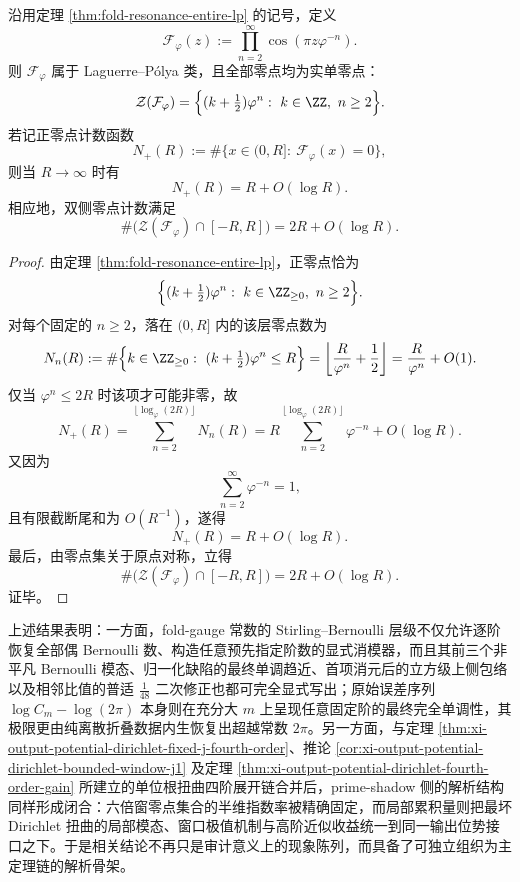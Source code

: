 \begin{theorem}[共振整函数零点计数的线性主项]\label{thm:xi-fold-resonance-entire-zero-counting-linear}
沿用定理 \ref{thm:fold-resonance-entire-lp} 的记号，定义
\[
\mathcal F_\varphi(z):=\prod_{n=2}^{\infty}\cos(\pi z\varphi^{-n}).
\]
则 \(\mathcal F_\varphi\) 属于 Laguerre--P\'olya 类，且全部零点均为实单零点：
\[
\mathcal Z(\mathcal F_\varphi)=\Bigl\{(k+\tfrac12)\varphi^n:\ k\in\ZZ,\ n\ge 2\Bigr\}.
\]
若记正零点计数函数
\[
N_+(R):=\#\{x\in(0,R]:\ \mathcal F_\varphi(x)=0\},
\]
则当 \(R\to\infty\) 时有
\[
\boxed{\;
N_+(R)=R+O(\log R).\;}
\]
相应地，双侧零点计数满足
\[
\boxed{\;
\#\bigl(\mathcal Z(\mathcal F_\varphi)\cap[-R,R]\bigr)=2R+O(\log R).\;}
\]
\end{theorem}
\begin{proof}
由定理 \ref{thm:fold-resonance-entire-lp}，正零点恰为
\[
\Bigl\{(k+\tfrac12)\varphi^n:\ k\in\ZZ_{\ge 0},\ n\ge 2\Bigr\}.
\]
对每个固定的 \(n\ge 2\)，落在 \((0,R]\) 内的该层零点数为
\[
N_n(R)
:=
\#\Bigl\{k\in\ZZ_{\ge 0}:\ (k+\tfrac12)\varphi^n\le R\Bigr\}
=
\left\lfloor \frac{R}{\varphi^n}+\frac12\right\rfloor
=
\frac{R}{\varphi^n}+O(1).
\]
仅当 \(\varphi^n\le 2R\) 时该项才可能非零，故
\[
N_+(R)
=
\sum_{n=2}^{\lfloor \log_\varphi(2R)\rfloor}N_n(R)
=
R\sum_{n=2}^{\lfloor \log_\varphi(2R)\rfloor}\varphi^{-n}
+O(\log R).
\]
又因为
\[
\sum_{n=2}^{\infty}\varphi^{-n}=1,
\]
且有限截断尾和为 \(O(R^{-1})\)，遂得
\[
N_+(R)=R+O(\log R).
\]
最后，由零点集关于原点对称，立得
\[
\#\bigl(\mathcal Z(\mathcal F_\varphi)\cap[-R,R]\bigr)=2R+O(\log R).
\]
证毕。
\end{proof}





\noindent 上述结果表明：一方面，fold-gauge 常数的 Stirling--Bernoulli 层级不仅允许逐阶恢复全部偶 Bernoulli 数、构造任意预先指定阶数的显式消模器，而且其前三个非平凡 Bernoulli 模态、归一化缺陷的最终单调趋近、首项消元后的立方级上侧包络以及相邻比值的普适 \(\frac{1}{48}\) 二次修正也都可完全显式写出；原始误差序列 \(\log C_m-\log(2\pi)\) 本身则在充分大 \(m\) 上呈现任意固定阶的最终完全单调性，其极限更由纯离散折叠数据内生恢复出超越常数 \(2\pi\)。另一方面，与定理 \ref{thm:xi-output-potential-dirichlet-fixed-j-fourth-order}、推论 \ref{cor:xi-output-potential-dirichlet-bounded-window-j1} 及定理 \ref{thm:xi-output-potential-dirichlet-fourth-order-gain} 所建立的单位根扭曲四阶展开链合并后，prime-shadow 侧的解析结构同样形成闭合：六倍窗零点集合的半维指数率被精确固定，而局部累积量则把最坏 Dirichlet 扭曲的局部模态、窗口极值机制与高阶近似收益统一到同一输出位势接口之下。于是相关结论不再只是审计意义上的现象陈列，而具备了可独立组织为主定理链的解析骨架。



\endinput

